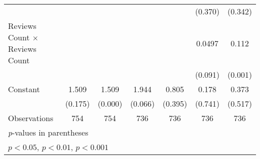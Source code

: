 {\begin{tabular}{l*{6}{c}}
                    &                     &                     &                     &                     &     (0.370)         &     (0.342)         \\
[1em]
Reviews Count $\times$ Reviews Count&                     &                     &                     &                     &      0.0497         &       0.112\sym{***}\\
                    &                     &                     &                     &                     &     (0.091)         &     (0.001)         \\
[1em]
Constant            &       1.509         &       1.509\sym{***}&       1.944         &       0.805         &       0.178         &       0.373         \\
                    &     (0.175)         &     (0.000)         &     (0.066)         &     (0.395)         &     (0.741)         &     (0.517)         \\
\hline
Observations        &         754         &         754         &         736         &         736         &         736         &         736         \\
\hline\hline
\multicolumn{7}{l}{\footnotesize \textit{p}-values in parentheses}\\
\multicolumn{7}{l}{\footnotesize \sym{*} \(p<0.05\), \sym{**} \(p<0.01\), \sym{***} \(p<0.001\)}\\
\end{tabular}
}
